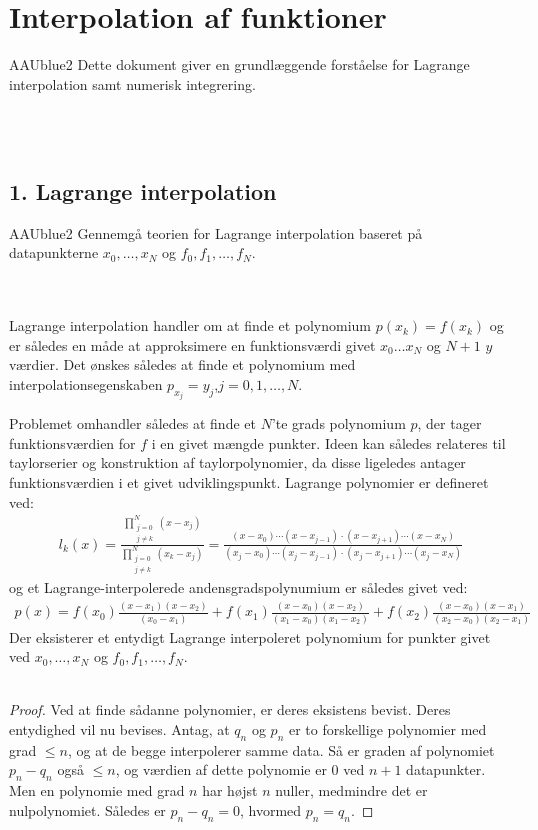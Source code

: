 \chapter{Interpolation af funktioner}
% 
%
\begin{color}{AAUblue2}
Dette dokument giver en grundlæggende forståelse for Lagrange interpolation samt numerisk integrering. 
%
\end{color}
\\\\
%
\section*{1. Lagrange interpolation}
%
\begin{color}{AAUblue2} Gennemgå teorien for Lagrange interpolation baseret på datapunkterne $x_0, \ldots, x_N$ og $f_0, f_1, \ldots , f_N$. 
\end{color}
\\\\ 
%
Lagrange interpolation handler om at finde et polynomium $p(x_k)=f(x_k)$ og er således en måde at approksimere en funktionsværdi givet $x_0 \ldots x_N$ og $N+1 $  $y$ værdier.
Det ønskes således at finde et polynomium med interpolationsegenskaben $p_{x_j}=y_j$,$j=0,1,\ldots,N$.

Problemet omhandler således at finde et $N$'te grads polynomium $p$, der tager funktionsværdien for $f$ i en givet mængde punkter. 
Ideen kan således relateres til taylorserier og konstruktion af taylorpolynomier, da disse ligeledes antager funktionsværdien i et givet udviklingspunkt.
Lagrange polynomier er defineret ved:
\begin{align*}
l_k(x)=\frac{\prod_{\substack{j=0 \\ {j \neq k}}}^{N}(x-x_j)}{\prod_{\substack{j=0 \\ {j \neq k}}}^{N}(x_k-x_j)}=\frac{(x-x_0) \cdots (x-x_{j-1}) \cdot (x-x_{j+1})\cdots(x-x_N)}{(x_j-x_0)\cdots (x_j-x_{j-1}) \cdot (x_j-x_{j+1})\cdots (x_j - x_N)}
\end{align*}
og et Lagrange-interpolerede andensgradspolynumium er således givet ved:
\begin{align*}
p(x)=f(x_0)\frac{(x-x_1)(x-x_2)}{(x_0-x_1)}+f(x_1)\frac{(x-x_0)(x-x_2)}{(x_1-x_0)(x_1-x_2)}+f(x_2)\frac{(x-x_0)(x-x_1)}{(x_2-x_0)(x_2-x_1)}
\end{align*}
Der eksisterer et entydigt Lagrange interpoleret polynomium for punkter givet ved $x_0, \ldots, x_N$ og $f_0, f_1, \ldots , f_N$.
\\\\
% 
\begin{proof}
Ved at finde sådanne polynomier, er deres eksistens bevist. Deres entydighed vil nu bevises. 
Antag, at $q_n$ og $p_n$ er to forskellige polynomier med grad $\leq n$, og at de begge interpolerer samme data. 
Så er graden af polynomiet $p_n - q_n$ også $\leq n$, og værdien af dette polynomie er $0$ ved $n+1$ datapunkter. 
Men en polynomie med grad $n$ har højst $n$ nuller, medmindre det er nulpolynomiet. 
Således er $p_n - q_n = 0$, hvormed $p_n = q_n$. 
\end{proof}
%
